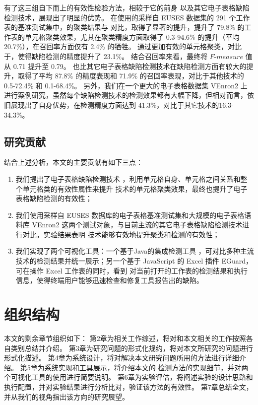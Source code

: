 有了这三组自下而上的有效性检验方法，\wa 相较于它的前身 \cu 以及其它电子表格缺陷检测技术，展现出了明显的优势。
在\cu 使用的采样自 EUSES \cite{fisher2005euses} 数据集的 291 个工作表的基准测试集中，\wa 的聚类结果与 \cu 对比，取得了显著的提升，提升了 79.8\% 的工作表的单元格聚类效果，尤其在聚类精度方面取得了 0.3-94.6\% 的提升（平均 20.7\%），在召回率方面仅有 2.4\% 的牺牲。
\wa 通过更加有效的单元格聚类，对比于\cu，使得缺陷检测的精度提升了 23.1\%。
结合召回率来看，最终将 $F\text{-}measure$ 值从 0.71 提升至 0.79。
\wa 也比其它电子表格缺陷检测技术在缺陷检测方面有较大的提升，取得了平均 87.8\% 的精度表现和 71.9\% 的召回率表现，对比于其他技术的 0.5-72.4\% 和 0.1-68.4\%。
另外，我们在一个更大的电子表格数据集 VEnron2 \cite{xu2017spreadcluster} 上进行案例研究，虽然每个缺陷检测技术的检测效果都有大幅下降，但相对而言，\wa 依旧展现出了自身优势，在检测精度方面达到 41.3\%，对比于其它技术的16.3-34.3\%。

\subsection{研究贡献}
结合上述分析，本文的主要贡献有如下三点：
\begin{enumerate}
    \item 我们提出了电子表格缺陷检测技术 \wa ，利用单元格自身、单元格之间关系和整个单元格类的有效性属性来提升 \cu 技术的单元格聚类效果，最终也提升了电子表格缺陷检测的有效性；
    \item 我们使用采样自 EUSES 数据库的电子表格基准测试集和大规模的电子表格语料库 VEnron2 这两个测试对象，与目前主流的其它电子表格缺陷检测技术进行对比，实验结果表明 \wa 技术能够有效地提升聚类和检测的有效性；
    \item 我们实现了两个可视化工具：一个基于Java的集成检测工具 \sg ，可对比多种主流技术的检测结果并统一展示；另一个基于 JavaScript 的 Excel 插件 EGuard，可在操作 Excel 工作表的同时，看到 \wa 对当前打开的工作表的检测结果和执行信息，使得终端用户能够迅速检查和修复工具报告出的缺陷。
\end{enumerate}


\section{组织结构}
本文的剩余章节组织如下：
第2章为相关工作综述，将对和本文相关的工作按照各自类别总结并介绍。
第3章为研究问题的形式化规约，将对本文所研究的问题进行形式化描述。
第4章为系统设计，将对解决本文研究问题所用的方法进行详细介绍。
第5章为系统实现和工具展示，将介绍本文的 \wa 检测方法的实现细节，并对两个可视化工具的使用进行简要说明。
第6章为实验评估，将阐述实验的设计思路和执行配置，并对实验结果进行分析比对，验证该方法的有效性。
第7章总结全文，并从我们的视角指出该方向的研究展望。